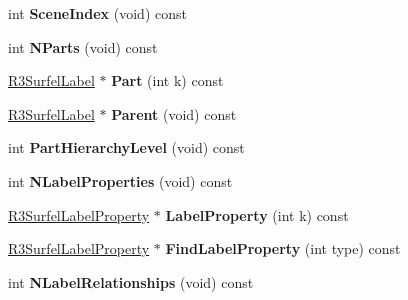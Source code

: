 \begin{DoxyCompactItemize}
\item 
int {\bfseries Scene\+Index} (void) const \hypertarget{class_r3_surfel_label_a8c429d2fa5dd108e5ac7b7e1047c5b38}{}\label{class_r3_surfel_label_a8c429d2fa5dd108e5ac7b7e1047c5b38}

\item 
int {\bfseries N\+Parts} (void) const \hypertarget{class_r3_surfel_label_a1fe4540dc64111f22a536dd66a988f5f}{}\label{class_r3_surfel_label_a1fe4540dc64111f22a536dd66a988f5f}

\item 
\hyperlink{class_r3_surfel_label}{R3\+Surfel\+Label} $\ast$ {\bfseries Part} (int k) const \hypertarget{class_r3_surfel_label_a50578dab1106fc14adfed338ddc93afe}{}\label{class_r3_surfel_label_a50578dab1106fc14adfed338ddc93afe}

\item 
\hyperlink{class_r3_surfel_label}{R3\+Surfel\+Label} $\ast$ {\bfseries Parent} (void) const \hypertarget{class_r3_surfel_label_aa3ef6a15d6e8cbcf4ff949633d8f4615}{}\label{class_r3_surfel_label_aa3ef6a15d6e8cbcf4ff949633d8f4615}

\item 
int {\bfseries Part\+Hierarchy\+Level} (void) const \hypertarget{class_r3_surfel_label_af93dee2555c8a35b535c1784b6b34600}{}\label{class_r3_surfel_label_af93dee2555c8a35b535c1784b6b34600}

\item 
int {\bfseries N\+Label\+Properties} (void) const \hypertarget{class_r3_surfel_label_a0fb3efa8ead0ac32768c9895dfe638c4}{}\label{class_r3_surfel_label_a0fb3efa8ead0ac32768c9895dfe638c4}

\item 
\hyperlink{class_r3_surfel_label_property}{R3\+Surfel\+Label\+Property} $\ast$ {\bfseries Label\+Property} (int k) const \hypertarget{class_r3_surfel_label_a4808bd997738b09c01fd151886ba9c5b}{}\label{class_r3_surfel_label_a4808bd997738b09c01fd151886ba9c5b}

\item 
\hyperlink{class_r3_surfel_label_property}{R3\+Surfel\+Label\+Property} $\ast$ {\bfseries Find\+Label\+Property} (int type) const \hypertarget{class_r3_surfel_label_a7f0fd40660afc803460bc529a2a24481}{}\label{class_r3_surfel_label_a7f0fd40660afc803460bc529a2a24481}

\item 
int {\bfseries N\+Label\+Relationships} (void) const \hypertarget{class_r3_surfel_label_a354f854deef51449e105e6fded508e48}{}\label{class_r3_surfel_label_a354f854deef51449e105e6fded508e48}


\end{DoxyCompactItemize}
